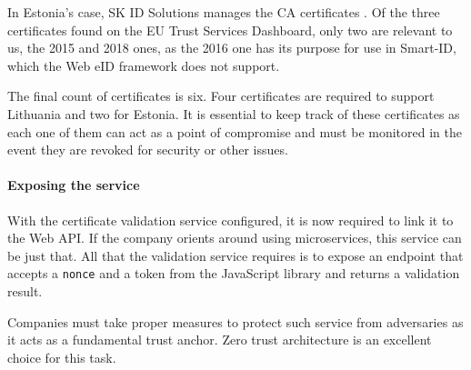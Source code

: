 In Estonia's case, SK ID Solutions manages the CA certificates \cite{eid-ee-skid-certificates}. Of the three certificates found on the EU Trust Services Dashboard, only two are relevant to us, the 2015 and 2018 ones, as the 2016 one has its purpose for use in Smart-ID, which the Web eID framework does not support.

The final count of certificates is six. Four certificates are required to support Lithuania and two for Estonia. It is essential to keep track of these certificates as each one of them can act as a point of compromise and must be monitored in the event they are revoked for security \cite{roca-vulnerability-lessons-learned} or other issues.

\paragraph{Exposing the service}

With the certificate validation service configured, it is now required to link it to the Web API. If the company orients around using microservices, this service can be just that. All that the validation service requires is to expose an endpoint that accepts a \texttt{nonce} and a token from the JavaScript library and returns a validation result.

Companies must take proper measures to protect such service from adversaries as it acts as a fundamental trust anchor. {Zero trust architecture} \cite{zero-trust-architecture} is an excellent choice for this task.
